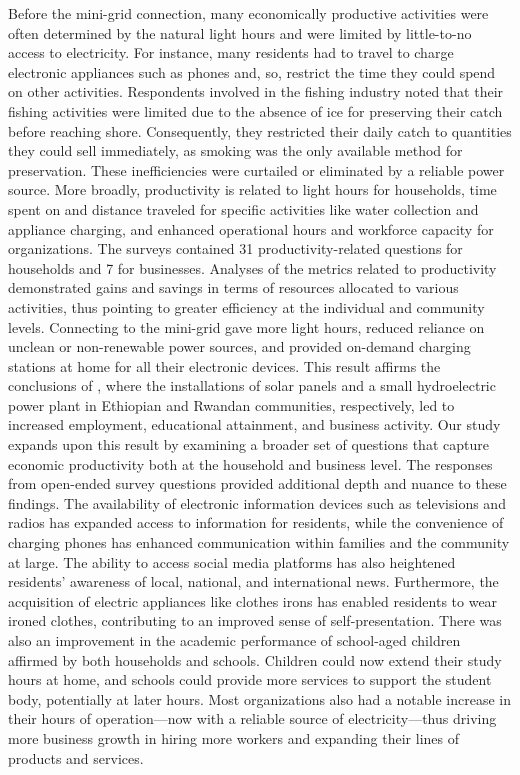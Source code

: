 Before the mini-grid connection, many economically productive activities were often determined by the natural light hours and were limited by little-to-no access to electricity. For instance, many residents had to travel to charge electronic appliances such as phones and, so, restrict the time they could spend on other activities.
Respondents involved in the fishing industry noted that their fishing activities were limited due to the absence of ice for preserving their catch before reaching shore. Consequently, they restricted their daily catch to quantities they could sell immediately, as smoking was the only available method for preservation.
These inefficiencies were curtailed or eliminated by a reliable power source. More broadly, productivity is related to light hours for households, time spent on and distance traveled for specific activities like water collection and appliance charging, and enhanced operational hours and workforce capacity for organizations. The surveys contained 31 productivity-related questions for households and 7 for businesses. Analyses of the metrics related to productivity demonstrated gains and savings in terms of resources allocated to various activities, thus pointing to greater efficiency at the individual and community levels. Connecting to the mini-grid gave more light hours, reduced reliance on unclean or non-renewable power sources, and provided on-demand charging stations at home for all their electronic devices. This result affirms the conclusions of \cite{wassie2021socio, uwineza2021analysis}, where the installations of solar panels and a small hydroelectric power plant in Ethiopian and Rwandan communities, respectively, led to increased employment, educational attainment, and business activity. Our study expands upon this result by examining a broader set of questions that capture economic productivity both at the household and business level.
The responses from open-ended survey questions provided additional depth and nuance to these findings. The availability of electronic information devices such as televisions and radios has expanded access to information for residents, while the convenience of charging phones has enhanced communication within families and the community at large. The ability to access social media platforms has also heightened residents' awareness of local, national, and international news. Furthermore, the acquisition of electric appliances like clothes irons has enabled residents to wear ironed clothes, contributing to an improved sense of self-presentation.
There was also an improvement in the academic performance of school-aged children affirmed by both households and schools. Children could now extend their study hours at home, and schools could provide more services to support the student body, potentially at later hours. Most organizations also had a notable increase in their hours of operation---now with a reliable source of electricity---thus driving more business growth in hiring more workers and expanding their lines of products and services.

